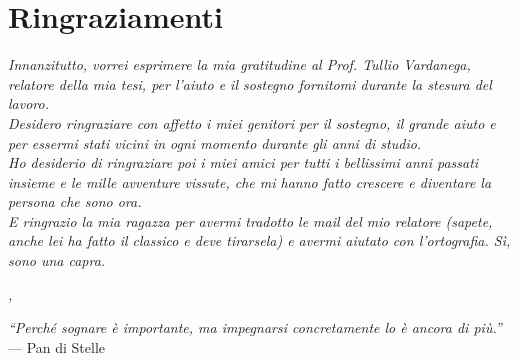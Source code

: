 
\cleardoublepage
{}
{}

\begingroup
\let\clearpage\relax
\let\cleardoublepage\relax
\let\cleardoublepage\relax

\chapter*{Ringraziamenti}

\noindent \textit{Innanzitutto, vorrei esprimere la mia gratitudine al Prof. Tullio Vardanega, relatore della mia tesi, per l'aiuto e il sostegno fornitomi durante la stesura del lavoro.}\\

\noindent \textit{Desidero ringraziare con affetto i miei genitori per il sostegno, il grande aiuto e per essermi stati vicini in ogni momento durante gli anni di studio.}\\

\noindent \textit{Ho desiderio di ringraziare poi i miei amici per tutti i bellissimi anni passati insieme e le mille avventure vissute, che mi hanno fatto crescere e diventare la persona che sono ora. \\
E ringrazio la mia ragazza per avermi tradotto le mail del mio relatore (sapete, anche lei ha fatto il classico e deve tirarsela) e avermi aiutato con l'ortografia. Sì, sono una capra.} \\
\bigskip

\noindent\textit{\myLocation, \myTime}
\hfill \myName

\vspace{250pt}
\begin{flushright}{
		\slshape    
		``Perché sognare è importante, ma impegnarsi concretamente lo è ancora di più.''  \medskip} \\ 
	\medskip
	--- Pan di Stelle
\end{flushright}
\endgroup

